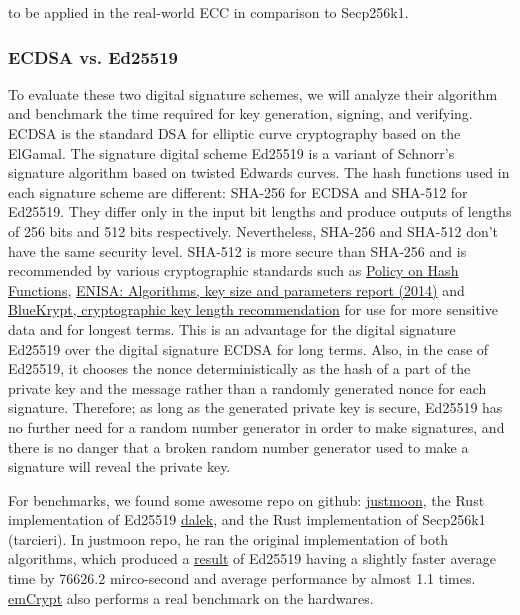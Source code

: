 to be applied in the real-world ECC in comparison to Secp256k1.


\subsubsection{ECDSA vs. Ed25519}

To evaluate these two digital signature schemes, we will analyze their algorithm and benchmark the time required for key generation, signing, and verifying. ECDSA is the standard DSA for elliptic curve cryptography based on the ElGamal. The signature digital scheme Ed25519 is a variant of Schnorr’s signature algorithm based on twisted Edwards curves. The hash functions used in each signature scheme are different: SHA-256 for ECDSA and SHA-512 for Ed25519. They differ only in the input bit lengths and produce outputs of lengths of 256 bits and 512 bits respectively. Nevertheless, SHA-256 and SHA-512 don’t have the same security level. SHA-512 is more secure than SHA-256 and is recommended by various cryptographic standards such as \href{https://csrc.nist.gov/projects/hash-functions/nist-policy-on-hash-functions}{Policy on Hash Functions}, \href{https://www.enisa.europa.eu/publications}{ENISA: Algorithms, key size and parameters report (2014)} and \href{https://www.keylength.com/en/}{BlueKrypt, cryptographic key length recommendation} for use for more sensitive data and for longest terms. This is an advantage for the digital signature Ed25519 over the digital signature ECDSA for long terms. Also, in the case of Ed25519, it chooses the nonce deterministically as the hash of a part of the private key and the message rather than a randomly generated nonce for each signature. Therefore; as long as the generated private key is secure, Ed25519 has no further need for a random number generator in order to make signatures, and there is no danger that a broken random number generator used to make a signature will reveal the private key.

For benchmarks, we found some awesome repo on github: \href{https://github.com/justmoon/curvebench}{justmoon}, the Rust implementation of Ed25519 \href{https://github.com/dalek-cryptography/ed25519-dalek}{dalek}, and the Rust implementation of Secp256k1 (tarcieri). In justmoon repo, he ran the original implementation of both algorithms, which produced a \href{http://justmoon.github.io/curvebench/benchmark.html}{result} of Ed25519 having a slightly faster average time by 76626.2 mirco-second and average performance by almost 1.1 times. \href{https://wiki.segger.com/emCrypt}{emCrypt} also performs a real benchmark on the hardwares.

